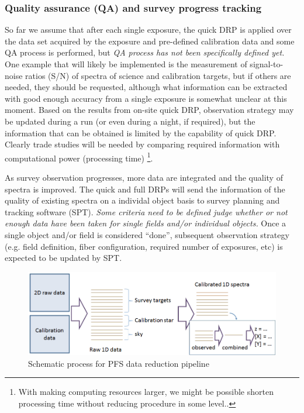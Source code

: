 \documentclass[a4paper,notitlepage]{article}
\begin{document}
\subsubsection{Quality assurance (QA) and survey progress tracking}
\label{sec:qa}

So far we assume that after each single exposure, the quick DRP is
applied 
over the data set acquired by the exposure and pre-defined calibration data 
and some QA process is performed, but {\it QA process has not
been specifically defined yet.}  One example that will likely be
implemented is the measurement of signal-to-noise ratios (S/N) of
spectra of science and calibration targets, but if others are needed,
they should be requested, although what information can be extracted
with good enough accuracy from a single exposure is somewhat unclear at
this moment. Based on the results from on-site quick DRP, observation
strategy may be updated during a run (or even during a night, if
required), but the information that can be obtained is limited by the
capability of quick DRP. Clearly trade studies will be needed by
comparing required information with computational power (processing
time) \footnote{With making computing resources larger, we might be
possible shorten processing time without reducing procedure in some
level..}.

As survey observation progresses, more data are integrated and the
quality of spectra is improved. The quick and full DRPs will send the
information of the quality of existing spectra on a individal object
basis to survey planning and tracking software (SPT). {\it Some criteria
need to be defined judge whether or not enough data have been taken for
single fields and/or individual objects.} Once a single object and/or
field is considered ``done'', subsequent observation strategy
(e.g. field definition, fiber configuration, required number of
exposures, etc) is expected to be updated by SPT.

\begin{figure}[htb]
  \begin{center}
    \includegraphics[width=.75\linewidth]{sciops-scireq-drp-slide.png}
  \end{center}
  \caption{Schematic process for PFS data reduction pipeline}
  \label{fig:sciops-scireq-drp-slide}
\end{figure}
\end{document}
